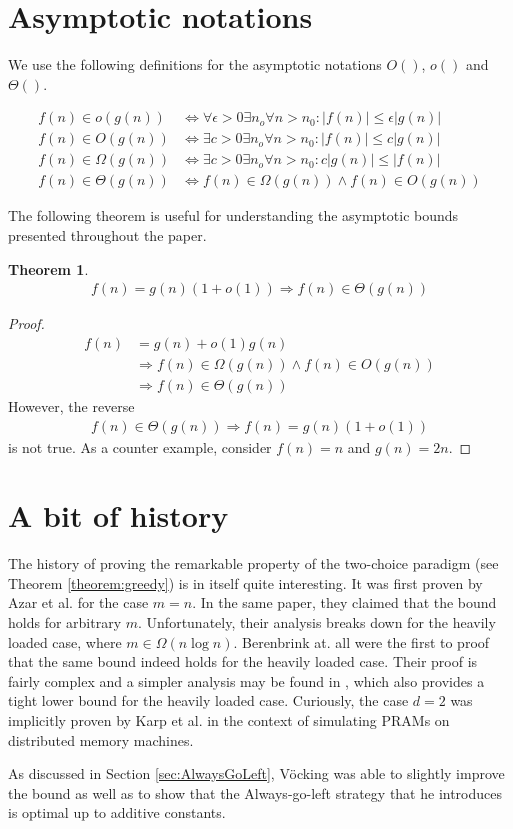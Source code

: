 \documentclass[a4paper,12pt]{article}
\newtheorem{theorem}{Theorem}
\begin{document}
\section{Asymptotic notations}
\label{sec:asymptotic}
We use the following definitions for the asymptotic notations $O()$, $o()$ and $\Theta()$.

\begin{align*}
f(n) \in o(g(n)) &\Leftrightarrow \forall \epsilon > 0 \exists n_o\forall n> n_0: |f(n)|\leq \epsilon  |g(n)|\\
f(n) \in O(g(n)) &\Leftrightarrow \exists c > 0 \exists n_o\forall n> n_0: |f(n)|\leq c  |g(n)|\\
f(n) \in \Omega(g(n)) &\Leftrightarrow \exists c > 0 \exists n_o\forall n> n_0: c  |g(n)| \leq |f(n)| \\
f(n) \in \Theta(g(n)) &\Leftrightarrow f(n) \in \Omega(g(n)) \land f(n)\in O(g(n))
\end{align*}

The following theorem is useful for understanding the asymptotic bounds presented throughout the paper.
\begin{theorem}\label{theorem:asymptotic}
\begin{align*}
f(n) = g(n)  (1+o(1)) \Rightarrow f(n) \in \Theta(g(n)) 
\end{align*}
\end{theorem}
\begin{proof}
\begin{align*}
f(n) &= g(n)+o(1) g(n) \\
&\Rightarrow f(n) \in \Omega(g(n)) \land f(n) \in O(g(n)) \\
&\Rightarrow f(n) \in \Theta(g(n))
\end{align*}
However, the reverse
\begin{align*}
f(n) \in \Theta(g(n)) \Rightarrow f(n) = g(n)  (1+o(1)) 
\end{align*}
is not true. As a counter example, consider $f(n) = n$ and $g(n) = 2n$.
\end{proof}

\section{A bit of history}
\label{sec:historyOfGreedy}
The history of proving the remarkable property of the two-choice paradigm (see Theorem \ref{theorem:greedy}) is in itself quite interesting. It was first proven by Azar et al. \cite{ABKU99} for the case $m = n$. In the same paper, they claimed that the bound holds for arbitrary $m$. Unfortunately, their analysis breaks down for the heavily loaded case, where $m \in \Omega\left(n  \log n\right)$. Berenbrink at. all \cite{BFZR08} were the first to proof that the same bound indeed holds for the heavily loaded case. Their proof is fairly complex and a simpler analysis may be found in \cite{TW13}, which also provides a tight lower bound for the heavily loaded case. Curiously, the case $d = 2$ was implicitly proven by Karp et al. in the context of simulating PRAMs on distributed memory machines\cite{KLM92}.

As discussed in Section \ref{sec:AlwaysGoLeft}, V\"ocking \cite{VOC03} was able to slightly improve the bound as well as to show that the Always-go-left strategy that he introduces is optimal up to additive constants.



 
\end{document}

